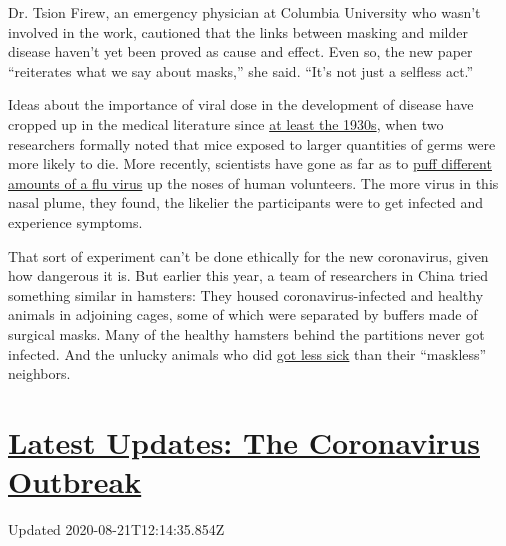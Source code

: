 Dr. Tsion Firew, an emergency physician at Columbia University who
wasn't involved in the work, cautioned that the links between masking
and milder disease haven't yet been proved as cause and effect. Even so,
the new paper ``reiterates what we say about masks,'' she said. ``It's
not just a selfless act.''

Ideas about the importance of viral dose in the development of disease
have cropped up in the medical literature since
\href{https://academic.oup.com/aje/article-abstract/27/3/493/99616}{at
least the 1930s}, when two researchers formally noted that mice exposed
to larger quantities of germs were more likely to die. More recently,
scientists have gone as far as to
\href{https://pubmed.ncbi.nlm.nih.gov/25416753/}{puff different amounts
of a flu virus} up the noses of human volunteers. The more virus in this
nasal plume, they found, the likelier the participants were to get
infected and experience symptoms.

That sort of experiment can't be done ethically for the new coronavirus,
given how dangerous it is. But earlier this year, a team of researchers
in China tried something similar in hamsters: They housed
coronavirus-infected and healthy animals in adjoining cages, some of
which were separated by buffers made of surgical masks. Many of the
healthy hamsters behind the partitions never got infected. And the
unlucky animals who did
\href{https://academic.oup.com/cid/article/doi/10.1093/cid/ciaa644/5848814}{got
less sick} than their ``maskless'' neighbors.

\hypertarget{latest-updates-the-coronavirus-outbreak}{%
\section{\texorpdfstring{\href{https://www.nytimes3xbfgragh.onion/2020/08/21/world/covid-19-coronavirus.html?action=click\&pgtype=Article\&state=default\&region=MAIN_CONTENT_1\&context=storylines_live_updates}{Latest
Updates: The Coronavirus
Outbreak}}{Latest Updates: The Coronavirus Outbreak}}\label{latest-updates-the-coronavirus-outbreak}}

Updated 2020-08-21T12:14:35.854Z

